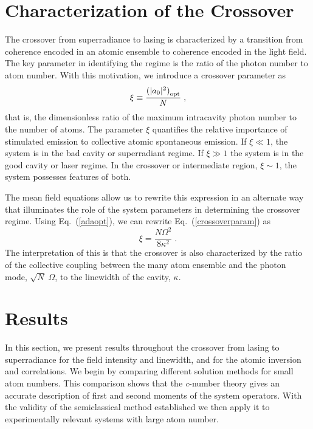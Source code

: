 \documentclass[aps,
twocolumn,
showpacs,
superscriptaddress,groupedaddress]{revtex4}
\begin{document}
\section{Characterization of the Crossover}
\label{sec:CrossoverCharacterization}

The crossover from superradiance to lasing is characterized by a
transition from coherence encoded in an atomic ensemble to coherence
encoded in the light field. The key parameter in identifying the
regime is the ratio of the photon number to atom number. With this
motivation, we introduce a crossover parameter as
\begin{equation}
\xi \equiv \frac{{(|a_0|^2)}_{\rm opt}}{N}\;,
\label{crossoverparam}
\end{equation}
that is, the dimensionless ratio of the maximum intracavity photon
number to the number of atoms. The parameter $\xi$ quantifies the
relative importance of stimulated emission to collective atomic
spontaneous emission. If $\xi\ll1$, the system is in the bad cavity or
superradiant regime. If $\xi\gg1$ the system is in the good cavity or
laser regime. In the crossover or intermediate region, $\xi\sim1$, the
system possesses features of both.

The mean field equations allow us to rewrite this expression in an
alternate way that illuminates the role of the system parameters in
determining the crossover regime. Using Eq.~(\ref{adaopt}), we can
rewrite Eq.~(\ref{crossoverparam}) as
\begin{equation}
  \xi= \frac{N \Omega^2}{8\kappa^2}\;.
\label{CrossoverParameter2}
\end{equation}
The interpretation of this is that the crossover is also characterized
by the ratio of the collective coupling between the many atom ensemble
and the photon mode, $\sqrt{N}\;\Omega$, to the linewidth of the
cavity, $\kappa$.


\section{Results}
\label{sec:Results}

In this section, we present results throughout the crossover from lasing
to superradiance for the field intensity and linewidth, and for the
atomic inversion and correlations. We begin by comparing different
solution methods for small atom numbers.  This comparison shows that the
\textit{c}-number theory gives an accurate description of first and second
moments of the system operators.  With the validity of the semiclassical
method established we then apply it to experimentally relevant systems
with large atom number.
\end{document}
